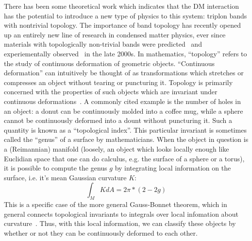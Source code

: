 \documentclass{thesis-umich}
\begin{document}
There has been some theoretical work which indicates that the DM interaction has the potential to introduce a new type of physics to this system: triplon bands with nontrivial topology. The importance of band topology has recently opened up an entirely new line of research in condensed matter physics, ever since materials with topologically non-trivial bands were predicted~\cite{Fu2007} and experiementally observed~\cite{Hsieh2008} in the late 2000s. In mathematics, ``topology'' refers to the study of continuous deformation of geometric objects. ``Continuous deformation'' can intuitively be thought of as transformations which stretches or compresses an object without tearing or puncturing it. Topology is primarily concerned with the properties of such objects which are invariant under continuous deformations~\cite{Munkres}. A commonly cited example is the number of holes in an object: a donut can be continuously molded into a coffee mug, while a sphere cannot be continuously deformed into a dount without puncturing it. Such a quantity is known as a ``topological index''. This particular invariant is sometimes called the ``genus'' of a surface by mathematicians. When the object in question is a (Reimannian) manifold (loosely, an object which looks locally enough like Euclidian space that one can do calculus, e.g. the surface of a sphere or a torus), it is possible to compute the genus $g$ by integrating local information on the surface, i.e. it's mean Gaussian curvature $K$:
\[ \int_M K dA = 2\pi * (2 - 2 g) \]
This is a specific case of the more general Gauss-Bonnet theorem, which in general connects topological invariants to integrals over local infomation about curvature~\cite{Lee}. Thus, with this local information, we can classify these objects by whether or not they can be continuously deformed to each other.
\end{document}
